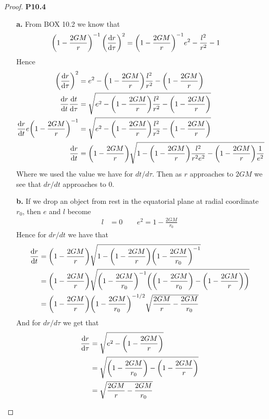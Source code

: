 \documentclass[11pt]{article}
\theoremstyle{definition}
\begin{document}
\cleardoublepage
\begin{proof}{\textbf{P10.4}}
\begin{itemize}
    \item [\textbf{a.}] From BOX 10.2 we know that
    \begin{align*}
        \bigg(1 - \frac{2GM}{r}\bigg)^{-1}\left(\dv{r}{\tau}\right)^2
        &= \bigg(1 - \frac{2GM}{r}\bigg)^{-1}e^2 - \frac{l^2}{r^2} - 1
    \end{align*}
    Hence
    \begin{align*}
        \left(\dv{r}{\tau}\right)^2
        &= e^2 - \bigg(1 - \frac{2GM}{r}\bigg)\frac{l^2}{r^2}
        - \bigg(1 - \frac{2GM}{r}\bigg)\\
        \dv{r}{t}\dv{t}{\tau}
        &= \sqrt{e^2 - \bigg(1 - \frac{2GM}{r}\bigg)\frac{l^2}{r^2}
        - \bigg(1 - \frac{2GM}{r}\bigg)}\\
        \dv{r}{t}e\bigg(1 - \frac{2GM}{r}\bigg)^{-1}
        &= \sqrt{e^2 - \bigg(1 - \frac{2GM}{r}\bigg)\frac{l^2}{r^2}
        - \bigg(1 - \frac{2GM}{r}\bigg)}\\
        \dv{r}{t}
        &= \bigg(1 - \frac{2GM}{r}\bigg)\sqrt{1 - \bigg(1 - \frac{2GM}{r}\bigg)
        \frac{l^2}{r^2e^2}
        - \bigg(1 - \frac{2GM}{r}\bigg)\frac{1}{e^2}}
    \end{align*}
    Where we used the value we have for $dt/d\tau$.
    Then as $r$ approaches to $2GM$ we see that $dr/dt$ approaches to 0.
    \item [\textbf{b.}]
    If we drop an object from rest in the equatorial plane at radial
    coordinate $r_0$, then $e$ and $l$ become
    \begin{align*}
        l &= 0 \qquad e^2 = 1 - \frac{2GM}{r_0} 
    \end{align*}
    Hence for $dr/dt$ we have that
    \begin{align*}
        \dv{r}{t}
        &= \bigg(1 - \frac{2GM}{r}\bigg)\sqrt{
        1 - \bigg(1 - \frac{2GM}{r}\bigg)\bigg(1 - \frac{2GM}{r_0}\bigg)^{-1}}\\
        &= \bigg(1 - \frac{2GM}{r}\bigg)\sqrt{
        \bigg(1 - \frac{2GM}{r_0}\bigg)^{-1}\bigg(
            \bigg(1 - \frac{2GM}{r_0}\bigg)- \bigg(1 - \frac{2GM}{r}\bigg)
        \bigg)}\\
        &= \bigg(1 - \frac{2GM}{r}\bigg)
        \bigg(1 - \frac{2GM}{r_0}\bigg)^{-1/2}
        \sqrt{\frac{2GM}{r} - \frac{2GM}{r_0}}
    \end{align*}
    And for $dr/d\tau$ we get that
    \begin{align*}
        \dv{r}{\tau}
        &= \sqrt{e^2 - \bigg(1 - \frac{2GM}{r}\bigg)}\\
        &= \sqrt{\bigg(1 - \frac{2GM}{r_0}\bigg) - \bigg(1 - \frac{2GM}{r}\bigg)}\\
        &= \sqrt{\frac{2GM}{r} - \frac{2GM}{r_0}}
    \end{align*}
\end{itemize}
\end{proof}
\end{document}
